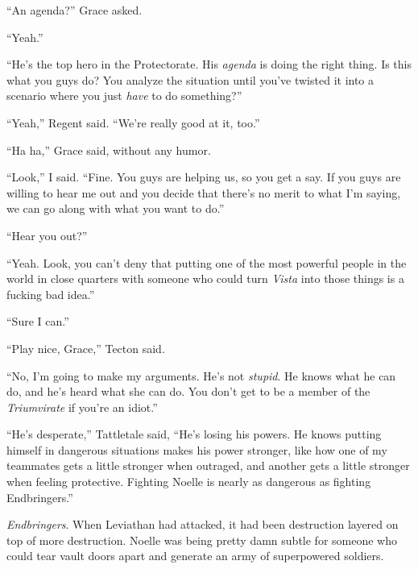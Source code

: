 ``An agenda?'' Grace asked.



``Yeah.''



``He's the top hero in the Protectorate.  His \emph{agenda} is doing the right thing.  Is this what you guys do?  You analyze the situation until you've twisted it into a scenario where you just \emph{have} to do something?''



``Yeah,'' Regent said.  ``We're really good at it, too.''



``Ha ha,'' Grace said, without any humor.



``Look,'' I said.  ``Fine.  You guys are helping us, so you get a say.  If you guys are willing to hear me out and you decide that there's no merit to what I'm saying, we can go along with what you want to do.''



``Hear you out?''



``Yeah.  Look, you can't deny that putting one of the most powerful people in the world in close quarters with someone who could turn \emph{Vista} into those things is a fucking bad idea.''



``Sure I can.''



``Play nice, Grace,'' Tecton said.



``No, I'm going to make my arguments.  He's not \emph{stupid}.  He knows what he can do, and he's heard what she can do.  You don't get to be a member of the \emph{Triumvirate} if you're an idiot.''



``He's desperate,'' Tattletale said,  ``He's losing his powers.  He knows putting himself in dangerous situations makes his power stronger, like how one of my teammates gets a little stronger when outraged, and another gets a little stronger when feeling protective.  Fighting Noelle is nearly as dangerous as fighting Endbringers.''



\emph{Endbringers}.  When Leviathan had attacked, it had been destruction layered on top of more destruction.  Noelle was being pretty damn subtle for someone who could tear vault doors apart and generate an army of superpowered soldiers.



